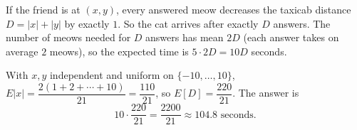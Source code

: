 If the friend is at $(x,y)$, every answered meow decreases the taxicab distance $D=|x|+|y|$ by exactly $1$. So the cat arrives after exactly $D$ answers. The number of meows needed for $D$ answers has mean $2D$ (each answer takes on average $2$ meows), so the expected time is $5\cdot2D=10D$ seconds.

With $x,y$ independent and uniform on $\{-10,\dots,10\}$, $E|x|=\dfrac{2(1+2+\cdots+10)}{21}=\dfrac{110}{21}$, so $E[D]=\dfrac{220}{21}$. The answer is
\[10\cdot\dfrac{220}{21}=\boxed{\dfrac{2200}{21}}\approx104.8\text{ seconds}.\]

